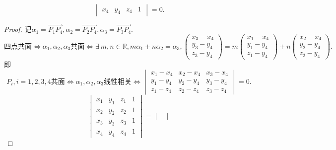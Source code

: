 \documentclass{article}
\begin{document}
\begin{enumerate}
\[\begin{vmatrix}
                x_4 & y_4 & z_4 & 1
            \end{vmatrix}=0.
        \]
        \begin{proof}
            记$\alpha_1=\overrightarrow{P_1 P_4},\alpha_2=\overrightarrow{P_2 P_4},\alpha_3=\overrightarrow{P_3 P_4}$.
            \[
                \mbox{四点共面}
                \Leftrightarrow
                \alpha_1,\alpha_2,\alpha_3 \mbox{共面}
                \Leftrightarrow
                \exists\ m,n\in \mathbb{R},m\alpha_1+n\alpha_2=\alpha_3,
                \begin{pmatrix}
                    x_3-x_4\\
                    y_3-y_4\\
                    z_3-y_4
                \end{pmatrix}
                =m\begin{pmatrix}
                    x_1-x_4\\
                    y_1-y_4\\
                    z_1-y_4
                \end{pmatrix}
                +n\begin{pmatrix}
                    x_2-x_4\\
                    y_2-y_4\\
                    z_2-y_4
                \end{pmatrix}.
            \]
            即
            \[
                P_i,i=1,2,3,4\mbox{共面}
                \Leftrightarrow
                \alpha_1,\alpha_2,\alpha_3
                \mbox{线性相关}
                \Leftrightarrow
                \begin{vmatrix}
                    x_1-x_4 & x_2-x_4 & x_3-x_4\\
                    y_1-y_4 & y_2-y_4 & y_3-y_4\\
                    z_1-z_4 & z_2-z_4 & z_3-z_4
                \end{vmatrix}=0.
            \]
            \[
                \begin{vmatrix}
                    x_1 & y_1 & z_1 & 1\\
                    x_2 & y_2 & z_2 & 1\\
                    x_3 & y_3 & z_3 & 1\\
                    x_4 & y_4 & z_4 & 1
                \end{vmatrix}=
                \begin{vmatrix}

\end{vmatrix}\]
\end{proof}
\end{enumerate}
\end{document}
